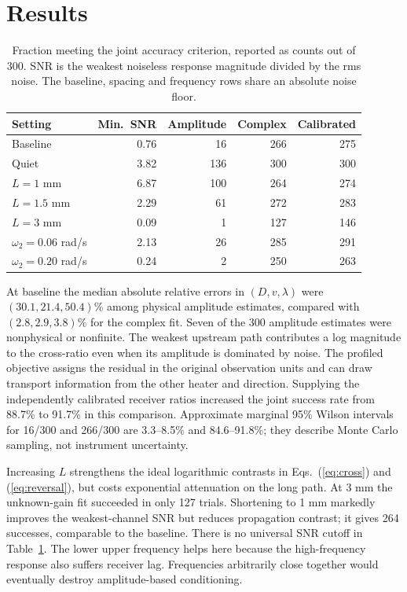 \documentclass[11pt]{article}
\begin{document}
\section{Results}
\begin{table}[ht]\centering
\caption{Fraction meeting the joint accuracy criterion, reported as counts out of 300. SNR is the weakest noiseless response magnitude divided by the rms noise. The baseline, spacing and frequency rows share an absolute noise floor.}
\begin{tabular}{lrrrr}
Setting & Min.\ SNR & Amplitude & Complex & Calibrated\\ \hline
Baseline &0.76&16&266&275\\
Quiet &3.82&136&300&300\\
$L=1$ mm &6.87&100&264&274\\
$L=1.5$ mm &2.29&61&272&283\\
$L=3$ mm &0.09&1&127&146\\
$\omega_2=0.06$ rad/s &2.13&26&285&291\\
$\omega_2=0.20$ rad/s &0.24&2&250&263
\end{tabular}\label{tab:main}\end{table}

At baseline the median absolute relative errors in $(D,v,\lambda)$ were $(30.1,21.4,50.4)\%$ among physical amplitude estimates, compared with $(2.8,2.9,3.8)\%$ for the complex fit. Seven of the 300 amplitude estimates were nonphysical or nonfinite. The weakest upstream path contributes a log magnitude to the cross-ratio even when its amplitude is dominated by noise. The profiled objective assigns the residual in the original observation units and can draw transport information from the other heater and direction. Supplying the independently calibrated receiver ratios increased the joint success rate from 88.7\% to 91.7\% in this comparison. Approximate marginal 95\% Wilson intervals for 16/300 and 266/300 are 3.3--8.5\% and 84.6--91.8\%; they describe Monte Carlo sampling, not instrument uncertainty.

Increasing $L$ strengthens the ideal logarithmic contrasts in Eqs.~(\ref{eq:cross}) and (\ref{eq:reversal}), but costs exponential attenuation on the long path. At 3 mm the unknown-gain fit succeeded in only 127 trials. Shortening to 1 mm markedly improves the weakest-channel SNR but reduces propagation contrast; it gives 264 successes, comparable to the baseline. There is no universal SNR cutoff in Table~\ref{tab:main}. The lower upper frequency helps here because the high-frequency response also suffers receiver lag. Frequencies arbitrarily close together would eventually destroy amplitude-based conditioning.
\end{document}
